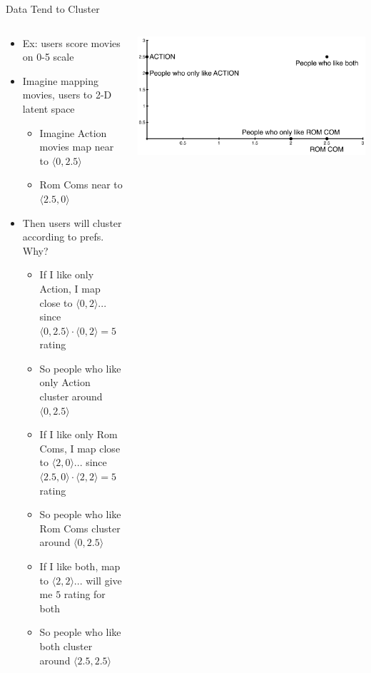 \documentclass[aspectratio=169]{beamer}
\begin{document}
\begin{frame}{Data Tend to Cluster}

\begin{columns}
\begin{column}{0.7\textwidth}
\begin{itemize}
	\item Ex: users score movies on 0-5 scale
	\item Imagine mapping movies, users to 2-D latent space
	\begin{itemize} 
	\item Imagine Action movies map near to $\langle 0, 2.5 \rangle$
	\item Rom Coms near to $\langle 2.5, 0 \rangle$
	\end{itemize}
	\item Then users will cluster according to prefs.  Why?
	\begin{itemize} 
	\item If I like only Action, I map close to $\langle 0, 2 \rangle$... since $\langle 0, 2.5 \rangle \cdot
		\langle 0, 2 \rangle = 5$ rating
	\item So people who like only Action cluster around $\langle 0, 2.5 \rangle$
	\item If I like only Rom Coms, I map close to $\langle 2, 0 \rangle$... since $\langle 2.5, 0 \rangle \cdot
		\langle 2, 2 \rangle = 5$ rating
	\item So people who like Rom Coms cluster around $\langle 0, 2.5 \rangle$
	\item If I like both, map to $\langle 2, 2 \rangle$... will give me $5$ rating for both
	\item So people who like both cluster around $\langle 2.5, 2.5 \rangle$
	\end{itemize}
\end{itemize}	
\end{column}
\begin{column}{0.3\textwidth}
    \includegraphics[width=1\textwidth]{lectUL/movieLatentSpace.pdf} 
\end{column}
\end{columns}
	
\end{frame}
\end{document}
